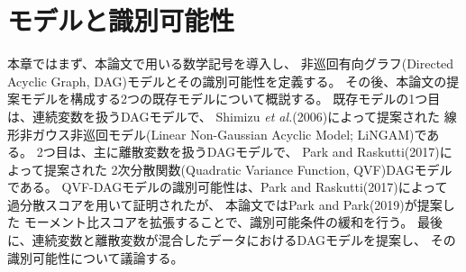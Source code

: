 \section{モデルと識別可能性}
\label{part:model}

本章ではまず、本論文で用いる数学記号を導入し、
非巡回有向グラフ(Directed Acyclic Graph, DAG)モデルとその識別可能性を定義する。
その後、本論文の提案モデルを構成する2つの既存モデルについて概説する。
既存モデルの1つ目は、連続変数を扱うDAGモデルで、
Shimizu \textit{et al.}(2006)\cite{Shimizu2006-yu}によって提案された
線形非ガウス非巡回モデル(Linear Non-Gaussian Acyclic Model; LiNGAM)である。
2つ目は、主に離散変数を扱うDAGモデルで、
Park and Raskutti(2017)\cite{Park2017-hw}によって提案された
2次分散関数(Quadratic Variance Function, QVF)DAGモデルである。
QVF-DAGモデルの識別可能性は、Park and Raskutti(2017)\cite{Park2017-hw}によって
過分散スコアを用いて証明されたが、
本論文ではPark and Park(2019)\cite{Park2019-qy}が提案した
モーメント比スコアを拡張することで、識別可能条件の緩和を行う。
最後に、連続変数と離散変数が混合したデータにおけるDAGモデルを提案し、
その識別可能性について議論する。

%

%

%

%

%

%

